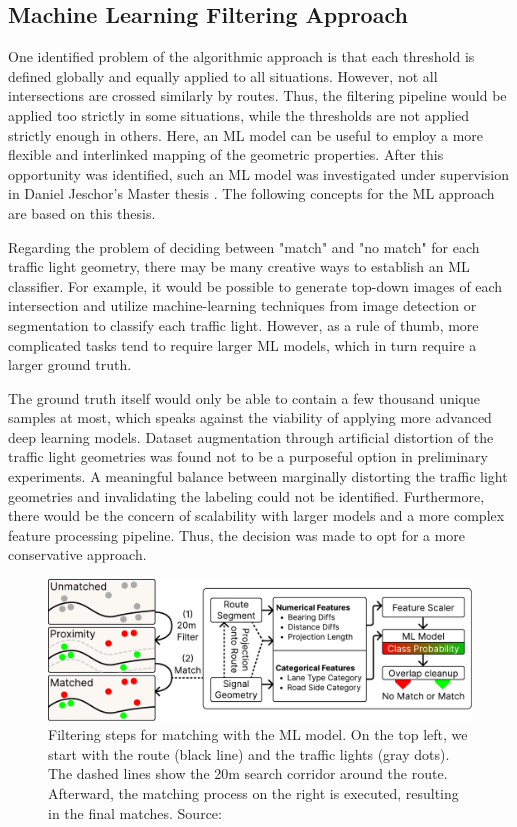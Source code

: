\subsection{Machine Learning Filtering Approach}\label{sec:jeschor1}

One identified problem of the algorithmic approach is that each threshold is defined globally and equally applied to all situations. However, not all intersections are crossed similarly by routes. Thus, the filtering pipeline would be applied too strictly in some situations, while the thresholds are not applied strictly enough in others. Here, an ML model can be useful to employ a more flexible and interlinked mapping of the geometric properties. After this opportunity was identified, such an ML model was investigated under supervision in Daniel Jeschor's Master thesis \cite{jeschor_2022}. The following concepts for the ML approach are based on this thesis.

Regarding the problem of deciding between "match" and "no match" for each traffic light geometry, there may be many creative ways to establish an ML classifier. For example, it would be possible to generate top-down images of each intersection and utilize machine-learning techniques from image detection or segmentation to classify each traffic light. However, as a rule of thumb, more complicated tasks tend to require larger ML models, which in turn require a larger ground truth. 

The ground truth itself would only be able to contain a few thousand unique samples at most, which speaks against the viability of applying more advanced deep learning models. Dataset augmentation through artificial distortion of the traffic light geometries was found not to be a purposeful option in preliminary experiments. A meaningful balance between marginally distorting the traffic light geometries and invalidating the labeling could not be identified. Furthermore, there would be the concern of scalability with larger models and a more complex feature processing pipeline. Thus, the decision was made to opt for a more conservative approach.

\begin{figure}[t]
\centering
\includegraphics[width=\linewidth]{images/sg-matching-ml-model.pdf}
\caption{Filtering steps for matching with the ML model. On the top left, we start with the route (black line) and the traffic lights (gray dots). The dashed lines show the 20m search corridor around the route. Afterward, the matching process on the right is executed, resulting in the final matches. Source: \cite{matthes2023geo}}
\label{fig:sg-matching-ml-model}
\end{figure}

